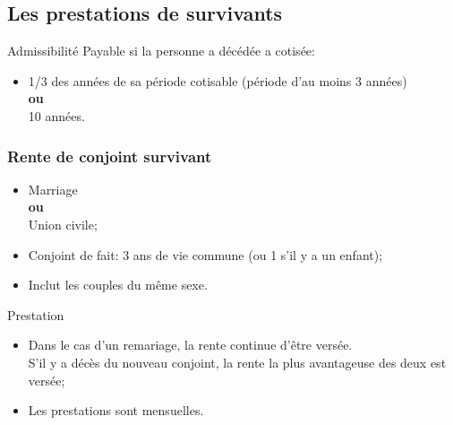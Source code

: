 \documentclass[10pt, french]{article}
\begin{document}
\begin{multicols*}{3}
\subsection*{Les prestations de survivants}

\begin{conceptgen}{Admissibilité}
Payable si la personne a décédée a cotisée:
\begin{itemize}[leftmargin = *]
	\item	1/3 des années de sa période cotisable (période d'au moins 3 années)	\\
			\textbf{ou}	\\
			10 années.
\end{itemize}
\end{conceptgen}

\subsubsection*{Rente de conjoint survivant}

\begin{definitionNOHFILL}[Conjoint]
\begin{itemize}[leftmargin = *]
	\item	Marriage	\\
			\textbf{ou}\\
			Union civile;
	\item	Conjoint de fait: 3 ans de vie commune (ou 1 s'il y a un enfant);
	\item	Inclut les couples du même sexe.
\end{itemize}
\end{definitionNOHFILL}

\begin{conceptgen}{Prestation}
\begin{itemize}[leftmargin = *]
	\item	Dans le cas d'un remariage, la rente continue d'être versée. \\
			S'il y a décès du nouveau conjoint, la rente la plus avantageuse des deux est versée;
	\item	Les prestations sont mensuelles.
\end{itemize}


\end{conceptgen}
\end{multicols*}
\end{document}
